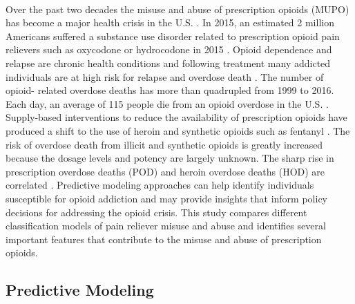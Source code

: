 \\\documentclass[sigconf]{acmart}
\begin{document}
Over the past two decades the misuse and abuse of prescription opioids (MUPO)  
has become a major health crisis in the U.S. \cite{volkow14}. In 2015, an 
estimated 2 million Americans suffered a substance use disorder related 
to prescription opioid pain relievers such as oxycodone or hydrocodone 
in 2015 \cite{nida18}. Opioid dependence and relapse are chronic health 
conditions and following treatment many addicted individuals are at high 
risk for relapse and overdose death \cite{shaham03}. The number of opioid-
related overdose deaths has more than quadrupled from 1999 to 2016. 
Each day, an average of 115 people die from an opioid overdose in the U.S. 
\cite{cdc18, judd16}. Supply-based interventions to reduce the availability 
of prescription opioids have produced a shift to the use of heroin and 
synthetic opioids such as fentanyl \cite{jones15}. The risk of overdose 
death from illicit and synthetic opioids is greatly increased because 
the dosage levels and potency are largely unknown. The sharp rise in 
prescription overdose deaths (POD) and heroin overdose deaths (HOD) are 
correlated \cite{muhuri13, unick13}. Predictive modeling approaches can 
help identify individuals susceptible for opioid addiction and may provide 
insights that inform policy decisions for addressing the opioid crisis. 
This study compares different classification models of pain reliever misuse 
and abuse and identifies several important features that contribute to 
the misuse and abuse of prescription opioids. 


\subsection{Predictive Modeling}
\end{document}

